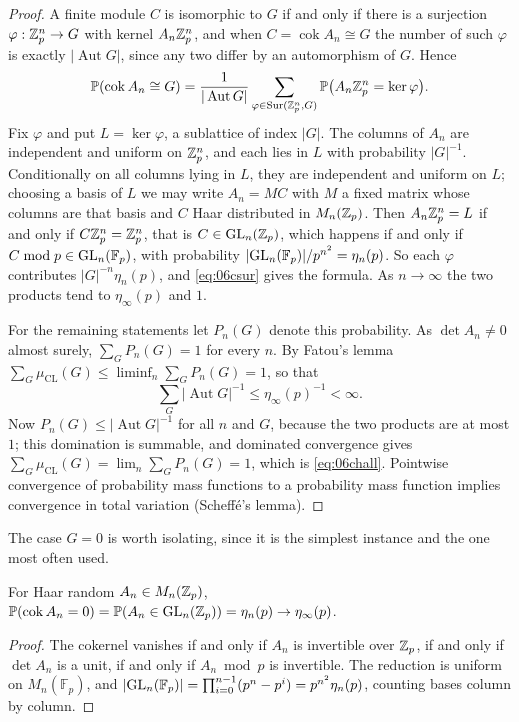 \begin{proof}
A finite module $C$ is isomorphic to $G$ if and only if there is a surjection $\varphi:\mathbb{Z}_p^n\to G$ with kernel $A_n\mathbb{Z}_p^n$, and when $C = \operatorname{cok}A_n\cong G$ the number of such $\varphi$ is exactly $|\operatorname{Aut}G|$, since any two differ by an automorphism of $G$. Hence
\[
\mathbb{P}(\operatorname{cok}A_n\cong G) = \frac{1}{|\operatorname{Aut}G|}\sum_{\varphi\in\operatorname{Sur}(\mathbb{Z}_p^n,G)}\mathbb{P}\bigl(A_n\mathbb{Z}_p^n = \ker\varphi\bigr).
\]
Fix $\varphi$ and put $L = \ker\varphi$, a sublattice of index $|G|$. The columns of $A_n$ are independent and uniform on $\mathbb{Z}_p^n$, and each lies in $L$ with probability $|G|^{-1}$. Conditionally on all columns lying in $L$, they are independent and uniform on $L$; choosing a basis of $L$ we may write $A_n = MC$ with $M$ a fixed matrix whose columns are that basis and $C$ Haar distributed in $M_n(\mathbb{Z}_p)$. Then $A_n\mathbb{Z}_p^n = L$ if and only if $C\mathbb{Z}_p^n = \mathbb{Z}_p^n$, that is $C\in\mathrm{GL}_n(\mathbb{Z}_p)$, which happens if and only if $C\bmod p\in\mathrm{GL}_n(\mathbb{F}_p)$, with probability $|\mathrm{GL}_n(\mathbb{F}_p)|/p^{n^2} = \eta_n(p)$. So each $\varphi$ contributes $|G|^{-n}\eta_n(p)$, and \eqref{eq:06csur} gives the formula. As $n\to\infty$ the two products tend to $\eta_\infty(p)$ and $1$.

For the remaining statements let $P_n(G)$ denote this probability. As $\det A_n\ne0$ almost surely, $\sum_GP_n(G) = 1$ for every $n$. By Fatou's lemma $\sum_G\mu_{\mathrm{CL}}(G)\le\liminf_n\sum_GP_n(G) = 1$, so that
\[
\sum_G|\operatorname{Aut}G|^{-1}\le\eta_\infty(p)^{-1}<\infty .
\]
 Now $P_n(G)\le|\operatorname{Aut}G|^{-1}$ for all $n$ and $G$, because the two products are at most $1$; this domination is summable, and dominated convergence gives $\sum_G\mu_{\mathrm{CL}}(G) = \lim_n\sum_GP_n(G) = 1$, which is \eqref{eq:06chall}. Pointwise convergence of probability mass functions to a probability mass function implies convergence in total variation (Scheff\'e's lemma).
\end{proof}

The case $G = 0$ is worth isolating, since it is the simplest instance and the one most often used.

\begin{corollary}\label{cor:06crank0}
For Haar random $A_n\in M_n(\mathbb{Z}_p)$, $\mathbb{P}(\operatorname{cok}A_n = 0) = \mathbb{P}(A_n\in\mathrm{GL}_n(\mathbb{Z}_p)) = \eta_n(p)\to\eta_\infty(p)$.
\end{corollary}

\begin{proof}
The cokernel vanishes if and only if $A_n$ is invertible over $\mathbb{Z}_p$, if and only if $\det A_n$ is a unit, if and only if $A_n\bmod p$ is invertible. The reduction is uniform on $M_n(\mathbb{F}_p)$, and $|\mathrm{GL}_n(\mathbb{F}_p)| = \prod_{i=0}^{n-1}(p^n-p^i) = p^{n^2}\eta_n(p)$, counting bases column by column.
\end{proof}

